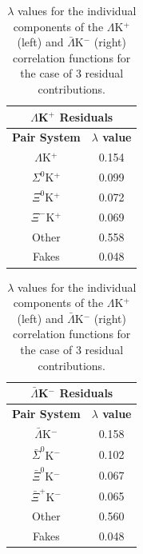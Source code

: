 \documentclass[../AnalysisNoteJBuxton.tex]{subfiles}
\begin{document}
\clearpage
\begin{table}[htbp]
 \centering
 \begin{minipage}{0.3\textwidth}
  \centering
  \begin{tabular}{|c|c|}
   \multicolumn{2}{c}{$\Lambda$K$^{+}$ Residuals} \\
   \hline
   \textbf{Pair System} & \textbf{$\lambda$ value} \\
   \hline
   $\Lambda$K$^{+}$ & 0.154 \\
   $\Sigma^{0}$K$^{+}$ & 0.099 \\
   $\Xi^{0}$K$^{+}$ & 0.072 \\
   $\Xi^{-}$K$^{+}$ & 0.069 \\
   Other & 0.558 \\
   Fakes & 0.048 \\
   \hline
  \end{tabular}
 \end{minipage}
 \begin{minipage}{0.3\textwidth}
  \centering
  \begin{tabular}{|c|c|}
   \multicolumn{2}{c}{$\bar{\Lambda}$K$^{-}$ Residuals} \\
   \hline
   \textbf{Pair System} & \textbf{$\lambda$ value} \\
   \hline
   $\bar{\Lambda}$K$^{-}$ & 0.158 \\
   $\bar{\Sigma}^{0}$K$^{-}$ & 0.102 \\
   $\bar{\Xi}^{0}$K$^{-}$ & 0.067 \\
   $\bar{\Xi}^{+}$K$^{-}$ & 0.065 \\
   Other & 0.560 \\
   Fakes & 0.048 \\
   \hline
  \end{tabular}
 \end{minipage}  
 \caption{$\lambda$ values for the individual components of the $\Lambda$K$^{+}$ (left) and $\bar{\Lambda}$K$^{-}$ (right) correlation functions for the case of 3 residual contributions.}
 \label{tab:LambdaValues_3Res_LamKchP}
\end{table}
\end{document}
